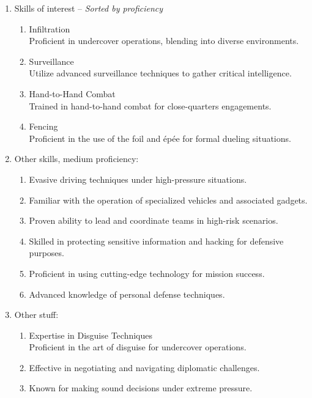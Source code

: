 \documentclass{article}
\begin{document}
\begin{enumerate}[label=\adforn{43}]

    \item {Skills of interest -- \textit{Sorted by proficiency}} {
        \begin{enumerate}[label=\adforn{7}]
            \item {Infiltration} \\ Proficient in undercover operations, blending into diverse environments.
            \item {Surveillance} \\ Utilize advanced surveillance techniques to gather critical intelligence.
            \item {Hand-to-Hand Combat} \\ Trained in hand-to-hand combat for close-quarters engagements.
            \item {Fencing} \\ Proficient in the use of the foil and épée for formal dueling situations.
        \end{enumerate}
    }

    \item {Other skills, medium proficiency:} {
        \begin{enumerate}[label=\adforn{7}]
            \item Evasive driving techniques under high-pressure situations.
            \item Familiar with the operation of specialized vehicles and associated gadgets.
            \item Proven ability to lead and coordinate teams in high-risk scenarios.
            \item Skilled in protecting sensitive information and hacking for defensive purposes.
            \item Proficient in using cutting-edge technology for mission success.
            \item Advanced knowledge of personal defense techniques.
        \end{enumerate}
    }

    \item {Other stuff:} {
        \begin{enumerate}[label=\adforn{7}]
            \item {Expertise in Disguise Techniques}
            \\ Proficient in the art of disguise for undercover operations.
            \item Effective in negotiating and navigating diplomatic challenges.
            \item Known for making sound decisions under extreme pressure.
        \end{enumerate}
    }
\end{enumerate}
\end{document}
